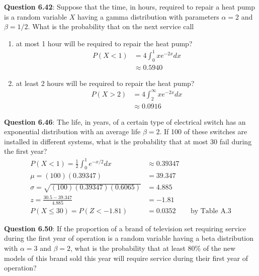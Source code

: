 \documentclass{article}
\begin{document}
    \noindent\textbf{Question 6.42}: Suppose that the time, in hours, required to
    repair a heat pump is a random variable $X$ having a gamma distribution 
    with parameters $\alpha = 2$ and $\beta = 1/2$. What is the probability 
    that on the next service call
        \begin{enumerate}[label = (\alph*) ]
            \item at most 1 hour will be required to repair the heat pump?
                \begin{align*}
                    P(X<1) &= 4\int_0^1 xe^{-2x}dx\\
                    &\approx 0.5940
                \end{align*}
            \item at least 2 hours will be required to repair the heat pump?
                \begin{align*}
                    P(X>2) &= 4\int_2^\infty xe^{-2x}dx\\
                    &\approx 0.0916
                \end{align*}
        \end{enumerate}

    \noindent\textbf{Question 6.46}: The life, in years, of a certain type of electrical
    switch has an exponential distribution with an average life $\beta = 2$. If 100 of 
    these switches are installed in different systems, what is the probability that at 
    most 30 fail during the first year?
        \begin{align*}
            P(X<1) = \frac{1}{2}\int_0^1 e^{-x/2}dx &\approx 0.39347\\
            \mu = (100)(0.39347) &= 39.347\\
            \sigma = \sqrt{(100)(0.39347)(0.6065)} &= 4.885\\
            z = \frac{30.5-39.347}{4.885} &= -1.81\\
            P(X\leq 30) = P(Z < -1.81) &= 0.0352 &&\text{by Table A.3}
        \end{align*}
    
    \noindent\textbf{Question 6.50}: If the proportion of a brand of television set 
    requiring service during the first year of operation is a random variable having 
    a beta distribution with $\alpha = 3$ and $\beta = 2$, what is the probability 
    that at least 80\% of the new models of this brand sold this year will require
    service during their first year of operation?\\\\
    
\end{document}
